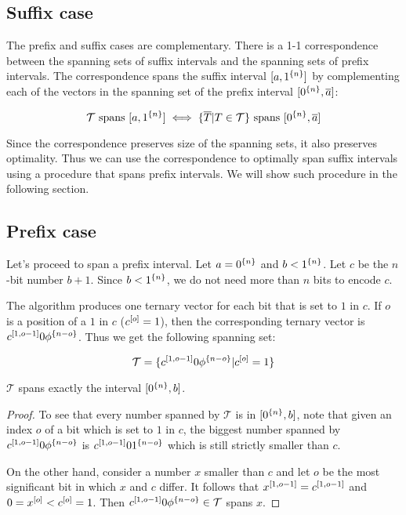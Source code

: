 \subsection{Suffix case}


The prefix and suffix cases are complementary.
There is a 1-1
correspondence between
the spanning sets of suffix intervals
and the spanning sets
of prefix intervals.
The correspondence spans the suffix interval
$[a, 1^{\{n\}}]$
by complementing each of the vectors in the spanning set
of the prefix interval
$[0^{\{n\}}, \overline{a}]$:

\[
\mathcal{T} \text{ spans } [a, 1^{\{n\}}]
\iff
\{\overline{T} | T \in \mathcal{T}\}
\text{ spans } [0^{\{n\}}, \overline{a}]
\]

Since the correspondence preserves
size of the spanning sets,
it also preserves optimality.
Thus we can use the correspondence to optimally span
suffix intervals
using a procedure that spans prefix intervals.
We will show such procedure in the following section.

\subsection{Prefix case}
\label{sec:prefix}

Let's proceed to span a prefix interval.
Let $a = 0^{\{n\}}$ and $b < 1^{\{n\}}$.
Let $c$ be the $n$-bit number $b + 1$.
Since $b < 1^{\{n\}}$,
we do not need more than $n$ bits to encode $c$.

The algorithm produces one ternary vector
for each bit that is set to $1$ in $c$.
If $o$ is a position of a $1$ in $c$
($c^{[o]} = 1$),
then the corresponding ternary vector
is $c^{[1, o - 1]} 0 \phi^{\{n - o\}}$.
Thus we get the following spanning set:

\begin{equation*}
\mathcal{T} =
\{c^{[1, o - 1]} 0 \phi^{\{n - o\}} | c^{[o]} = 1\}
\end{equation*}

\begin{theorem}[Feasibility]
\label{theorem:prefixfeasible}
$\mathcal{T}$ spans exactly the interval
$[0^{\{n\}}, b]$.
\end{theorem}

\begin{proof}
To see that every number spanned by $\mathcal{T}$
is in $[0^{\{n\}}, b]$,
note that given an index $o$ of a bit which is set to $1$
in $c$,
the biggest number spanned by
$c^{[1, o-1]} 0 \phi^{\{n-o\}}$ is
$c^{[1, o-1]} 0 1^{\{n-o\}}$
which is still strictly smaller than $c$.

On the other hand,
consider a number $x$ smaller than $c$
and let $o$ be the most significant bit in which $x$ and $c$ differ. It follows that
$x^{[1, o-1]} = c^{[1, o-1]}$
and $0 = x^{[o]} < c^{[o]} = 1$.
Then
$c^{[1, o - 1]} 0 \phi^{\{n - o\}} \in \mathcal{T}$
spans $x$.
\end{proof}


